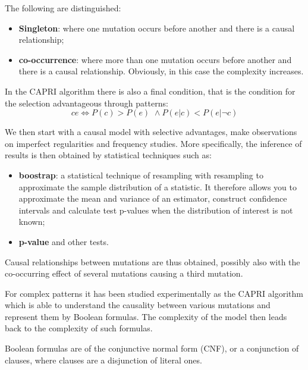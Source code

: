The following are distinguished:
\begin{itemize}
    \item \textbf{Singleton}: where one mutation occurs before another and there is a causal relationship;
    \item \textbf{co-occurrence}: where more than one mutation occurs before another and there is a
          causal relationship. Obviously, in this case the complexity increases.
\end{itemize}

In the CAPRI algorithm there is also a final condition, that is the condition for the selection
advantageous through patterns:
\begin{equation*}
    c e \Longleftrightarrow P(c) > P(e) \,\, \land P(e | c) < P(e| \lnot c)
\end{equation*}

We then start with a causal model with selective advantages, make observations on imperfect regularities
and frequency studies. More specifically, the inference of results is then obtained by statistical
techniques such as:
\begin{itemize}
    \item \textbf{boostrap}: a statistical technique of resampling with resampling to approximate the
          sample distribution of a statistic. It therefore allows you to approximate the mean and variance
          of an estimator, construct confidence intervals and calculate test p-values when the distribution
          of interest is not known;
    \item \textbf{p-value} and other tests.
\end{itemize}

Causal relationships between mutations are thus obtained, possibly also with the co-occurring effect
of several mutations causing a third mutation.

For complex patterns it has been studied experimentally as the CAPRI algorithm which is able to understand
the causality between various mutations and represent them by Boolean formulas. The complexity of the
model then leads back to the complexity of such formulas.

Boolean formulas are of the conjunctive normal form (CNF), or a conjunction of clauses, where clauses are
a disjunction of literal ones.


